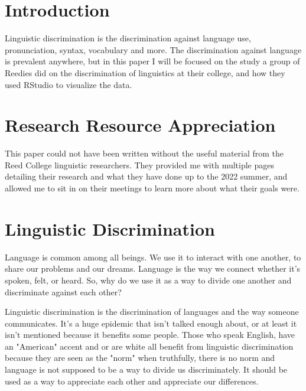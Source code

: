 \documentclass{scrartcl}
\begin{document}
\newpage



\doublespacing
\tableofcontents
\singlespacing

\newpage

\doublespacing

\section{Introduction}

\MEDIUM Linguistic discrimination is the discrimination against language use, pronunciation, syntax, vocabulary and more. The discrimination against language is prevalent anywhere, but in this paper I will be focused on the study a group of Reedies did on the discrimination of linguistics at their college, and how they used RStudio to visualize the data.

\section{Research Resource Appreciation}

This paper could not have been written without the useful material from the Reed College linguistic researchers. They provided me with multiple pages detailing their research and what they have done up to the 2022 summer, and allowed me to sit in on their meetings to learn more about what their goals were.

\section{Linguistic Discrimination}

Language is common among all beings. We use it to interact with one another, to share our problems and our dreams. Language is the way we connect whether it's spoken, felt, or heard. So, why do we use it as a way to divide one another and discriminate against each other? 

Linguistic discrimination is the discrimination of languages and the way someone communicates. It's a huge epidemic that isn't talked enough about, or at least it isn't mentioned because it benefits some people. Those who speak English, have an "American" accent and or are white all benefit from linguistic discrimination because they are seen as the "norm" when truthfully, there is no norm and language is not supposed to be a way to divide us discriminately. It should be used as a way to appreciate each other and appreciate our differences.
\end{document}
